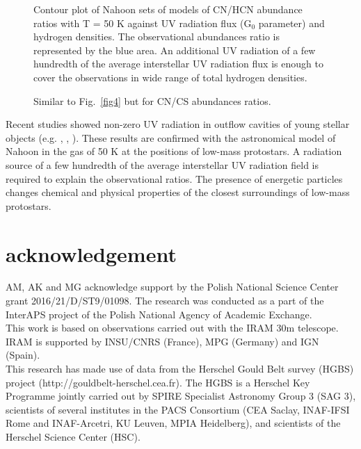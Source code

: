 \documentclass[a4paper]{article}
\begin{document}
\begin{figure}[!h]
\centering
\begin{minipage}[t]{.45\linewidth}
\centering
{}
\caption{Contour plot of Nahoon sets of models of CN/HCN abundance ratios with T = 50 K against UV radiation flux (G$_0$ parameter) and hydrogen densities. The observational abundances ratio is represented by the blue area. An additional UV radiation of a few hundredth of the average interstellar UV radiation flux is enough to cover the observations in wide range of total hydrogen densities.}\label{fig4}
\end{minipage}
\hfill
\begin{minipage}[t]{.45\linewidth}
\centering
{}
\caption{Similar to Fig.~\ref{fig4} but for CN/CS abundances ratios.}\label{fig5}
\end{minipage}
\end{figure}

\indent \indent Recent studies showed non-zero UV radiation in outflow cavities of young stellar objects (e.g. \cite{vanKempen2009}, \cite{kristensen2017}, \cite{karska2018}). These results are confirmed with the astronomical model of Nahoon in the gas of 50 K at the positions of low-mass protostars. A radiation source of a few hundredth of the average interstellar UV radiation field is required to explain the observational ratios. The presence of energetic particles changes chemical and physical properties of the closest surroundings of low-mass protostars. 

\section*{\sc acknowledgement}
\indent \indent AM, AK and MG acknowledge support by the Polish National Science Center grant 2016/21/D/ST9/01098. The research was conducted as a part of the InterAPS project of the Polish National Agency of Academic Exchange.\\
This work is based on observations carried out with the IRAM 30m telescope. IRAM is supported by INSU/CNRS (France), MPG (Germany) and IGN (Spain). \\
This research has made use of data from the Herschel Gould Belt survey (HGBS) project (http://gouldbelt-herschel.cea.fr). The HGBS is a Herschel Key Programme jointly carried out by SPIRE Specialist Astronomy Group 3 (SAG 3), scientists of several institutes in the PACS Consortium (CEA Saclay, INAF-IFSI Rome and INAF-Arcetri, KU Leuven, MPIA Heidelberg), and scientists of the Herschel Science Center (HSC).
\end{document}
